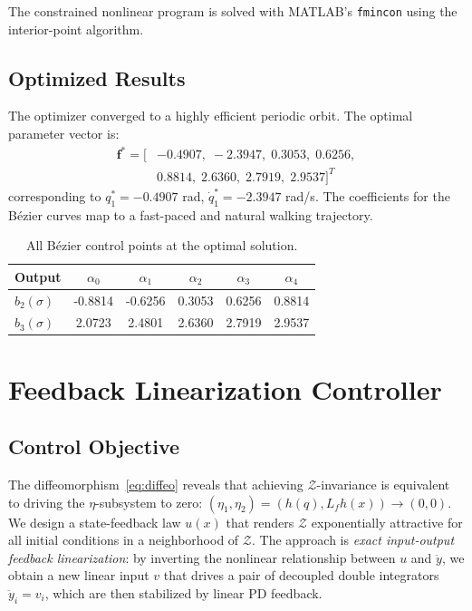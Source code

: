 \documentclass[conference]{IEEEtran}
\begin{document}
The constrained nonlinear program is solved with MATLAB's \texttt{fmincon} using the interior-point algorithm.

\subsection{Optimized Results}

The optimizer converged to a highly efficient periodic orbit. The optimal parameter vector is:
\begin{equation}
\begin{split}
    \bm{f}^* = \bigl[& -0.4907,\; -2.3947,\; 0.3053,\; 0.6256, \\
                     & 0.8814,\; 2.6360,\; 2.7919,\; 2.9537 \bigr]^T
\end{split}
\end{equation}
corresponding to $q_1^* = -0.4907$ rad, $\dot{q}_1^* = -2.3947$ rad/s. The coefficients for the B\'ezier curves map to a fast-paced and natural walking trajectory.

\begin{table}[htbp]
    \centering
    \caption{All B\'ezier control points at the optimal solution.}
    \label{tab:bezier}
    \begin{tabular}{lccccc}
        \toprule
        \textbf{Output} & $\alpha_0$ & $\alpha_1$ & $\alpha_2$ & $\alpha_3$ & $\alpha_4$ \\
        \midrule
        $b_2(\sigma)$ & -0.8814 & -0.6256 & 0.3053 & 0.6256 & 0.8814 \\
        $b_3(\sigma)$ & 2.0723 & 2.4801 & 2.6360 & 2.7919 & 2.9537 \\
        \bottomrule
    \end{tabular}
\end{table}

\section{Feedback Linearization Controller} \label{sec:control}

\subsection{Control Objective}

The diffeomorphism~\eqref{eq:diffeo} reveals that achieving $\mathcal{Z}$-invariance is equivalent to driving the $\eta$-subsystem to zero: $(\eta_1, \eta_2) = (h(q), L_f h(x)) \to (0,0)$. We design a state-feedback law $u(x)$ that renders $\mathcal{Z}$ exponentially attractive for all initial conditions in a neighborhood of $\mathcal{Z}$. The approach is \emph{exact input-output feedback linearization}: by inverting the nonlinear relationship between $u$ and $\ddot{y}$, we obtain a new linear input $v$ that drives a pair of decoupled double integrators $\ddot{y}_i = v_i$, which are then stabilized by linear PD feedback.
\end{document}
